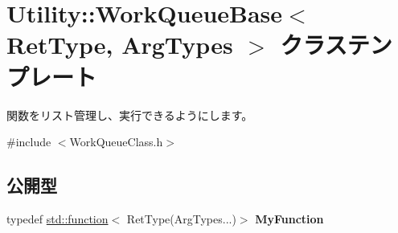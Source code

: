 \hypertarget{class_utility_1_1_work_queue_base}{}\section{Utility\+:\+:Work\+Queue\+Base$<$ Ret\+Type, Arg\+Types $>$ クラステンプレート}
\label{class_utility_1_1_work_queue_base}


関数をリスト管理し、実行できるようにします。 




{\ttfamily \#include $<$Work\+Queue\+Class.\+h$>$}

\subsection*{公開型}
\begin{DoxyCompactItemize}
\item 
typedef \hyperlink{classstd_1_1function}{std\+::function}$<$ Ret\+Type(Arg\+Types...)$>$ {\bfseries My\+Function}\hypertarget{class_utility_1_1_work_queue_base_a659c6fc2f8ec7468026d4d6f853a16fa}{}\label{class_utility_1_1_work_queue_base_a659c6fc2f8ec7468026d4d6f853a16fa}

\end{DoxyCompactItemize}
